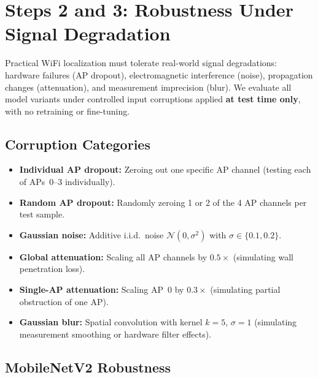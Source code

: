 \documentclass[11pt,a4paper]{article}
\begin{document}
\section{Steps 2 and 3: Robustness Under Signal Degradation}
\label{sec:robustness}

Practical WiFi localization must tolerate real-world signal degradations: hardware failures (AP dropout), electromagnetic interference (noise), propagation changes (attenuation), and measurement imprecision (blur).
We evaluate all model variants under controlled input corruptions applied \textbf{at test time only}, with no retraining or fine-tuning.

\subsection{Corruption Categories}

\begin{itemize}[nosep]
  \item \textbf{Individual AP dropout:} Zeroing out one specific AP channel (testing each of APs~0--3 individually).
  \item \textbf{Random AP dropout:} Randomly zeroing 1 or 2 of the 4 AP channels per test sample.
  \item \textbf{Gaussian noise:} Additive i.i.d.\ noise $\mathcal{N}(0, \sigma^2)$ with $\sigma \in \{0.1, 0.2\}$.
  \item \textbf{Global attenuation:} Scaling all AP channels by $0.5\times$ (simulating wall penetration loss).
  \item \textbf{Single-AP attenuation:} Scaling AP~0 by $0.3\times$ (simulating partial obstruction of one AP).
  \item \textbf{Gaussian blur:} Spatial convolution with kernel $k = 5$, $\sigma = 1$ (simulating measurement smoothing or hardware filter effects).
\end{itemize}


\subsection{MobileNetV2 Robustness}
\end{document}

